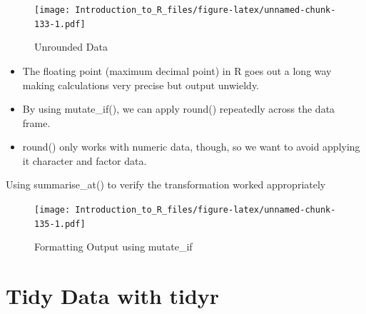 \documentclass[]{book}
\newenvironment{Shaded}{\begin{snugshade}}{\end{snugshade}}
\newcommand{\DataTypeTok}[1]{\textcolor[rgb]{0.13,0.29,0.53}{#1}}
\newcommand{\DecValTok}[1]{\textcolor[rgb]{0.00,0.00,0.81}{#1}}
\newcommand{\KeywordTok}[1]{\textcolor[rgb]{0.13,0.29,0.53}{\textbf{#1}}}
\newcommand{\NormalTok}[1]{#1}
\newcommand{\OperatorTok}[1]{\textcolor[rgb]{0.81,0.36,0.00}{\textbf{#1}}}
\newcommand{\OtherTok}[1]{\textcolor[rgb]{0.56,0.35,0.01}{#1}}
\newcommand{\StringTok}[1]{\textcolor[rgb]{0.31,0.60,0.02}{#1}}
\providecommand{\tightlist}{%
  \setlength{\itemsep}{0pt}\setlength{\parskip}{0pt}}
\theoremstyle{definition}
\theoremstyle{definition}
\theoremstyle{definition}
\theoremstyle{remark}
\let\BeginKnitrBlock\begin \let\EndKnitrBlock\end
\begin{document}
\begin{figure}
\centering
\texttt{[image: Introduction\_to\_R\_files/figure-latex/unnamed-chunk-133-1.pdf]}
\caption{\label{fig:unnamed-chunk-133}Unrounded Data}
\end{figure}

\begin{itemize}
\tightlist
\item
  The floating point (maximum decimal point) in R goes out a long way making calculations very precise but output unwieldy.
\item
  By using mutate\_if(), we can apply round() repeatedly across the data frame.
\item
  round() only works with numeric data, though, so we want to avoid applying it character and factor data.
\end{itemize}

\BeginKnitrBlock{example}
\protect\hypertarget{exm:summariseat3}{}{\label{exm:summariseat3} }Using summarise\_at() to verify the transformation worked appropriately
\EndKnitrBlock{example}

\begin{Shaded}
\end{Shaded}

\begin{figure}
\centering
\texttt{[image: Introduction\_to\_R\_files/figure-latex/unnamed-chunk-135-1.pdf]}
\caption{\label{fig:unnamed-chunk-135}Formatting Output using mutate\_if}
\end{figure}

\hypertarget{part-tidy-data-with-tidyr}{%
\part{Tidy Data with tidyr}\label{part-tidy-data-with-tidyr}}
\end{document}
